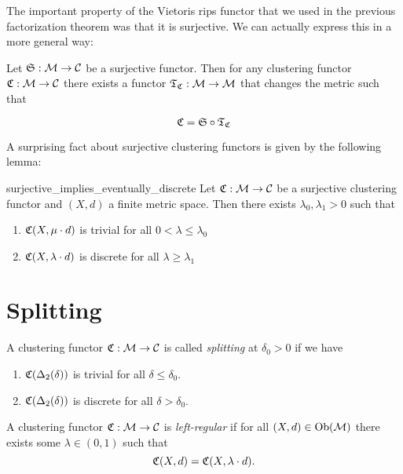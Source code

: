 The important property of the Vietoris rips functor that we used in the previous factorization theorem was that it is surjective. We can actually express this in a more general way:

\begin{proposition}{}{}
    Let $\mathfrak{S}: \mathcal{M} \to \mathcal{C}$ be a surjective functor. Then for any clustering functor $\mathfrak{C}: \mathcal{M} \to \mathcal{C}$ there exists a functor $\mathfrak{T}_{\mathfrak{C}}: \mathcal{M} \to \mathcal{M}$ that changes the metric such that

    \begin{equation*}
        \mathfrak{C} = \mathfrak{S} \circ \mathfrak{T}_{\mathfrak{C}}
    \end{equation*}

    \newresult
\end{proposition}

A surprising fact about surjective clustering functors is given by the following lemma:

\begin{lemma}{}{surjective_implies_eventually_discrete}
    Let $\mathfrak{C}: \mathcal{M} \to \mathcal{C}$ be a surjective clustering functor and $(X,d)$ a finite metric space. Then there exists $\lambda_0,\lambda_1 > 0$ such that
    \begin{enumerate}
        \item $\mathfrak{C}(X,\mu \cdot d)$ is trivial for all $0 < \lambda \le \lambda_0$
        \item $\mathfrak{C}(X,\lambda \cdot d)$ is discrete for all $\lambda \ge \lambda_1$
    \end{enumerate}

    \newresult
\end{lemma}

\section{Splitting}

\begin{definition}{}{}
    A clustering functor $\mathfrak{C}: \mathcal{M} \to \mathcal{C}$ is called \emph{splitting} at $\delta_0 > 0$ if we have
    \begin{enumerate}
        \item $\mathfrak{C}(\Delta_2(\delta))$ is trivial for all $\delta \leq \delta_0$.
        \item $\mathfrak{C}(\Delta_2(\delta))$ is discrete for all $\delta > \delta_0$.
    \end{enumerate}
\end{definition}

\begin{definition}{}{}
    A clustering functor $\mathfrak{C}: \mathcal{M} \to \mathcal{C}$ is \emph{left-regular} if for all $(X,d) \in \mathrm {Ob}(\mathcal{M})$ there exists some $\lambda \in (0, 1)$ such that
    $$
    \mathfrak{C}(X,d) = \mathfrak{C}(X, \lambda \cdot d).
    $$
    
\end{definition}

